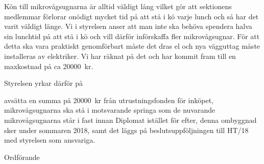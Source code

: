 \documentclass[../_main/handlingar.tex]{subfiles}
\begin{document}

Kön till mikrovågsugnarna är alltid väldigt lång vilket gör att sektionens medlemmar förlorar onödigt mycket tid på att stå i kö varje lunch och så har det varit väldigt länge. Vi i styrelsen anser att man inte ska behöva spendera halva sin lunchtid på att stå i kö och vill därför införskaffa fler mikrovågsugnar. För att detta ska vara praktiskt genomförbart måste det dras el och nya vägguttag måste installeras av elektriker. Vi har räknat på det och har kommit fram till en maxkostnad på ca \SI{20 000}{kr}. 

Styrelsen yrkar därför på

\begin{attsatser}
    \att avsätta en summa på \SI{20 000}{kr} från utrustningsfonden för inköpet,
    \att mikrovågsugnarna ska stå i motsvarande springa som de nuvarande mikrovågsugnarna står i fast innan Diplomat istället för efter,
    \att denna ombyggnad sker under sommaren 2018, samt
    \att det läggs på beslutsuppföljningen till HT/18 med styrelsen som ansvariga.
\end{attsatser}

\begin{signatures}{1}
    \ist
    \signature{\ordf}{Ordförande}
\end{signatures}
\end{document}
